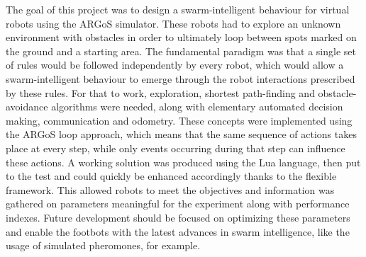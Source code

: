 The goal of this project was to design a swarm-intelligent behaviour for virtual robots using the ARGoS simulator. These robots had to explore an unknown environment with obstacles in order to ultimately loop between spots marked on the ground and a starting area. The fundamental paradigm was that a single set of rules would be followed independently by every robot, which would allow a swarm-intelligent behaviour to emerge through the robot interactions prescribed by these rules. For that to work, exploration, shortest path-finding and obstacle-avoidance algorithms were needed, along with elementary automated decision making, communication and odometry. These concepts were implemented using the ARGoS loop approach, which means that the same sequence of actions takes place at every step, while only events occurring during that step can influence these actions. A working solution was produced using the Lua language, then put to the test and could quickly be enhanced accordingly thanks to the flexible framework. This allowed robots to meet the objectives and information was gathered on parameters meaningful for the experiment along with performance indexes. Future development should be focused on optimizing these parameters and enable the footbots with the latest advances in swarm intelligence, like the usage of simulated pheromones, for example.
